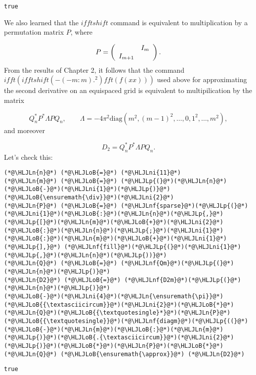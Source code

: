 \documentclass[12pt,landscape]{article}
\newcommand{\HLJLn}[1]{#1}
\newcommand{\HLJLnf}[1]{\textcolor[RGB]{66,102,213}{#1}}
\newcommand{\HLJLni}[1]{\textcolor[RGB]{59,151,46}{#1}}
\newcommand{\HLJLoB}[1]{\textcolor[RGB]{102,102,102}{\textbf{#1}}}
\newcommand{\HLJLp}[1]{#1}
\begin{document}
{\begin{lstlisting}
true
\end{lstlisting}


We also learned that the $ifftshift$ command is equivalent to multiplication by a permutation matrix $P$, where

\[
P = \left(
\begin{array}{c c}
   & I_{m} \\
I_{m+1} & 
\end{array}
\right).
\]
From the results of Chapter 2, it follows that the command $ifft(ifftshift(-(-m:m).^2)fft(f(xx)))$ used above for approximating the second derivative on an equispaced grid is equivalent to multipilication by the matrix

\[
Q_n^*P^*\Lambda PQ_n, \qquad \Lambda = -4\pi^2\mathrm{diag}(m^2, (m-1)^2, \ldots, 0, 1^2, \ldots, m^2),
\]
and moreover

\[
D_2 = Q_n^*P^*\Lambda PQ_n.
\]
Let's check this:


\begin{lstlisting}
(*@\HLJLn{n}@*) (*@\HLJLoB{=}@*) (*@\HLJLni{11}@*)
(*@\HLJLn{m}@*) (*@\HLJLoB{=}@*) (*@\HLJLp{(}@*)(*@\HLJLn{n}@*)(*@\HLJLoB{-}@*)(*@\HLJLni{1}@*)(*@\HLJLp{)}@*)(*@\HLJLoB{\ensuremath{\div}}@*)(*@\HLJLni{2}@*)
(*@\HLJLn{P}@*) (*@\HLJLoB{=}@*) (*@\HLJLnf{sparse}@*)(*@\HLJLp{(}@*)(*@\HLJLni{1}@*)(*@\HLJLoB{:}@*)(*@\HLJLn{n}@*)(*@\HLJLp{,}@*) (*@\HLJLp{[}@*)(*@\HLJLn{m}@*)(*@\HLJLoB{+}@*)(*@\HLJLni{2}@*)(*@\HLJLoB{:}@*)(*@\HLJLn{n}@*)(*@\HLJLp{;}@*)(*@\HLJLni{1}@*)(*@\HLJLoB{:}@*)(*@\HLJLn{m}@*)(*@\HLJLoB{+}@*)(*@\HLJLni{1}@*)(*@\HLJLp{],}@*) (*@\HLJLnf{fill}@*)(*@\HLJLp{(}@*)(*@\HLJLni{1}@*)(*@\HLJLp{,}@*)(*@\HLJLn{n}@*)(*@\HLJLp{))}@*)
(*@\HLJLn{Q}@*) (*@\HLJLoB{=}@*) (*@\HLJLnf{Qm}@*)(*@\HLJLp{(}@*)(*@\HLJLn{n}@*)(*@\HLJLp{)}@*)
(*@\HLJLn{D2}@*) (*@\HLJLoB{=}@*) (*@\HLJLnf{D2m}@*)(*@\HLJLp{(}@*)(*@\HLJLn{n}@*)(*@\HLJLp{)}@*)
(*@\HLJLoB{-}@*)(*@\HLJLni{4}@*)(*@\HLJLn{\ensuremath{\pi}}@*)(*@\HLJLoB{{\textasciicircum}}@*)(*@\HLJLni{2}@*)(*@\HLJLoB{*}@*)(*@\HLJLn{Q}@*)(*@\HLJLoB{{\textquotesingle}*}@*)(*@\HLJLn{P}@*)(*@\HLJLoB{{\textquotesingle}}@*)(*@\HLJLnf{diagm}@*)(*@\HLJLp{((}@*)(*@\HLJLoB{-}@*)(*@\HLJLn{m}@*)(*@\HLJLoB{:}@*)(*@\HLJLn{m}@*)(*@\HLJLp{)}@*)(*@\HLJLoB{.{\textasciicircum}}@*)(*@\HLJLni{2}@*)(*@\HLJLp{)}@*)(*@\HLJLoB{*}@*)(*@\HLJLn{P}@*)(*@\HLJLoB{*}@*)(*@\HLJLn{Q}@*) (*@\HLJLoB{\ensuremath{\approx}}@*) (*@\HLJLn{D2}@*)
\end{lstlisting}

\begin{lstlisting}
true
\end{lstlisting}


}
\end{document}
